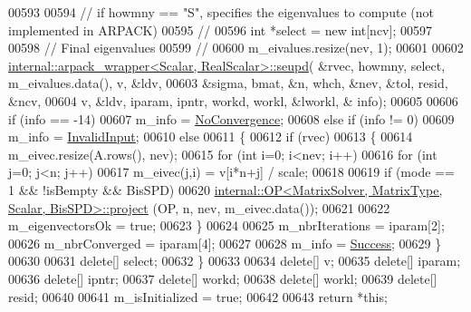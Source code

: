 \begin{DoxyCode}
00593 
00594     \textcolor{comment}{// if howmny == "S", specifies the eigenvalues to compute (not implemented in ARPACK)}
00595     \textcolor{comment}{//}
00596     \textcolor{keywordtype}{int} *select = \textcolor{keyword}{new} \textcolor{keywordtype}{int}[ncv];
00597 
00598     \textcolor{comment}{// Final eigenvalues}
00599     \textcolor{comment}{//}
00600     m\_eivalues.resize(nev, 1);
00601 
00602     \hyperlink{struct_eigen_1_1internal_1_1arpack__wrapper}{internal::arpack\_wrapper<Scalar, RealScalar>::seupd}(
      &rvec, howmny, select, m\_eivalues.data(), v, &ldv,
00603                                                         &sigma, bmat, &n, whch, &nev, &tol, resid, &ncv,
00604                                                         v, &ldv, iparam, ipntr, workd, workl, &lworkl, &
      info);
00605 
00606     \textcolor{keywordflow}{if} (info == -14)
00607       m\_info = \hyperlink{group__enums_gga85fad7b87587764e5cf6b513a9e0ee5eaba1c8763d1179778070f365ecc4157a8}{NoConvergence};
00608     \textcolor{keywordflow}{else} \textcolor{keywordflow}{if} (info != 0)
00609       m\_info = \hyperlink{group__enums_gga85fad7b87587764e5cf6b513a9e0ee5ea945604f62795ffc70aedf2bd12ea0434}{InvalidInput};
00610     \textcolor{keywordflow}{else}
00611     \{
00612       \textcolor{keywordflow}{if} (rvec)
00613       \{
00614         m\_eivec.resize(A.rows(), nev);
00615         \textcolor{keywordflow}{for} (\textcolor{keywordtype}{int} i=0; i<nev; i++)
00616           \textcolor{keywordflow}{for} (\textcolor{keywordtype}{int} j=0; j<n; j++)
00617             m\_eivec(j,i) = v[i*n+j] / scale;
00618       
00619         \textcolor{keywordflow}{if} (mode == 1 && !isBempty && BisSPD)
00620           \hyperlink{struct_eigen_1_1internal_1_1_o_p}{internal::OP<MatrixSolver, MatrixType, Scalar, BisSPD>::project}
      (OP, n, nev, m\_eivec.data());
00621 
00622         m\_eigenvectorsOk = \textcolor{keyword}{true};
00623       \}
00624 
00625       m\_nbrIterations = iparam[2];
00626       m\_nbrConverged  = iparam[4];
00627 
00628       m\_info = \hyperlink{group__enums_gga85fad7b87587764e5cf6b513a9e0ee5ea52581b035f4b59c203b8ff999ef5fcea}{Success};
00629     \}
00630 
00631     \textcolor{keyword}{delete}[] select;
00632   \}
00633 
00634   \textcolor{keyword}{delete}[] v;
00635   \textcolor{keyword}{delete}[] iparam;
00636   \textcolor{keyword}{delete}[] ipntr;
00637   \textcolor{keyword}{delete}[] workd;
00638   \textcolor{keyword}{delete}[] workl;
00639   \textcolor{keyword}{delete}[] resid;
00640 
00641   m\_isInitialized = \textcolor{keyword}{true};
00642 
00643   \textcolor{keywordflow}{return} *\textcolor{keyword}{this};

\end{DoxyCode}
